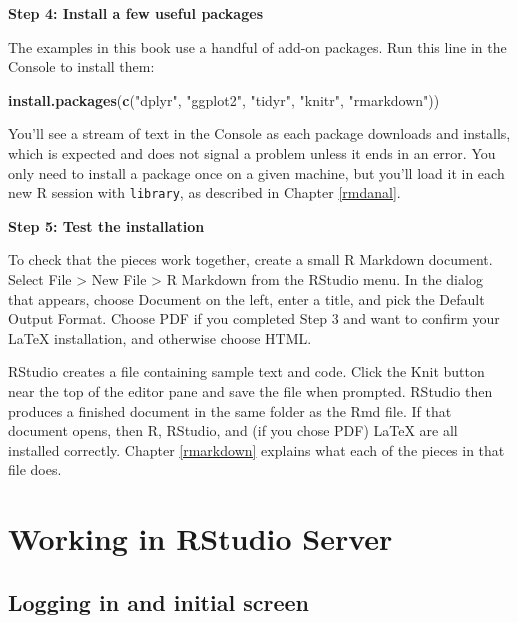 \documentclass[]{tufte-book}
\newenvironment{Shaded}{\begin{snugshade}}{\end{snugshade}}
\newcommand{\FunctionTok}[1]{\textcolor[rgb]{0.13,0.29,0.53}{\textbf{#1}}}
\newcommand{\NormalTok}[1]{#1}
\newcommand{\StringTok}[1]{\textcolor[rgb]{0.31,0.60,0.02}{#1}}
\begin{document}
\noindent\textbf{Step 4: Install a few useful packages}\vspace*{0.1in}

The examples in this book use a handful of add-on packages. Run this line in the Console to install them:

\begin{Shaded}
\begin{Highlighting}[]
\FunctionTok{install.packages}\NormalTok{(}\FunctionTok{c}\NormalTok{(}\StringTok{"dplyr"}\NormalTok{, }\StringTok{"ggplot2"}\NormalTok{, }\StringTok{"tidyr"}\NormalTok{, }\StringTok{"knitr"}\NormalTok{, }\StringTok{"rmarkdown"}\NormalTok{))}
\end{Highlighting}
\end{Shaded}

You'll see a stream of text in the Console as each package downloads and installs, which is expected and does not signal a problem unless it ends in an error. You only need to install a package once on a given machine, but you'll load it in each new R session with \texttt{library}, as described in Chapter \ref{rmdanal}.

\vspace*{0.2in}

\noindent\textbf{Step 5: Test the installation}\vspace*{0.1in}

To check that the pieces work together, create a small R Markdown document. Select File \textgreater{} New File \textgreater{} R Markdown from the RStudio menu. In the dialog that appears, choose Document on the left, enter a title, and pick the Default Output Format. Choose PDF if you completed Step 3 and want to confirm your LaTeX installation, and otherwise choose HTML.

RStudio creates a file containing sample text and code. Click the Knit button near the top of the editor pane and save the file when prompted. RStudio then produces a finished document in the same folder as the Rmd file. If that document opens, then R, RStudio, and (if you chose PDF) LaTeX are all installed correctly. Chapter \ref{rmarkdown} explains what each of the pieces in that file does.

\section{Working in RStudio Server}\label{working-in-rstudio-server}

\subsection{Logging in and initial screen}\label{logging-in-and-initial-screen}
\end{document}
